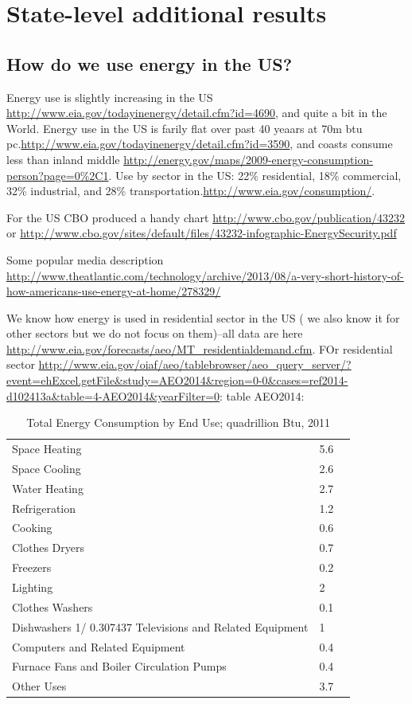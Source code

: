 \documentclass[10pt, letterpaper]{article}
\begin{document}
\begin{spacing}{1.4}
\begin{verbatim}
\end{verbatim}

\section{State-level additional results}
\subsection{How do we use energy in the US?}

Energy use is slightly increasing in the US
\url{http://www.eia.gov/todayinenergy/detail.cfm?id=4690}, and quite a bit in
the World. 
Energy use in the US is farily flat over past 40 yeaars at 70m btu
pc.\url{http://www.eia.gov/todayinenergy/detail.cfm?id=3590}, and coasts consume
less than inland middle
\url{http://energy.gov/maps/2009-energy-consumption-person?page=0%2C1}. 
Use by sector in the US: 22\% residential, 18\% commercial, 32\% industrial, and
28\% transportation.\url{http://www.eia.gov/consumption/}. 


For the US CBO produced a handy chart \url{http://www.cbo.gov/publication/43232} or \url{http://www.cbo.gov/sites/default/files/43232-infographic-EnergySecurity.pdf}

Some popular media description
\url{http://www.theatlantic.com/technology/archive/2013/08/a-very-short-history-of-how-americans-use-energy-at-home/278329/}

We know how energy is used in residential sector in the US ( we also know it for
other sectors but we do not focus on them)--all data are here
\url{http://www.eia.gov/forecasts/aeo/MT_residentialdemand.cfm}. FOr residential
sector
\url{http://www.eia.gov/oiaf/aeo/tablebrowser/aeo_query_server/?event=ehExcel.getFile&study=AEO2014&region=0-0&cases=ref2014-d102413a&table=4-AEO2014&yearFilter=0}:
table AEO2014: 


\begin{table}[H]\centering\footnotesize
\caption{\label{freq_im_god} Total Energy Consumption by End Use; quadrillion
  Btu, 2011}
\begin{tabular}{lll}   \hline 
Space Heating&	5.6\\
Space Cooling&	2.6\\
Water Heating&	2.7\\
Refrigeration&	1.2\\
Cooking&	0.6\\
Clothes Dryers&	0.7\\
Freezers&	0.2\\
Lighting&	2\\
Clothes Washers&	0.1\\
Dishwashers 1/	0.307437
Televisions and Related Equipment&	1\\
Computers and Related Equipment &	0.4\\
Furnace Fans and Boiler Circulation Pumps&	0.4\\
Other Uses&	3.7\\\hline
\end{tabular}\end{table}


\end{spacing}
\end{document}

